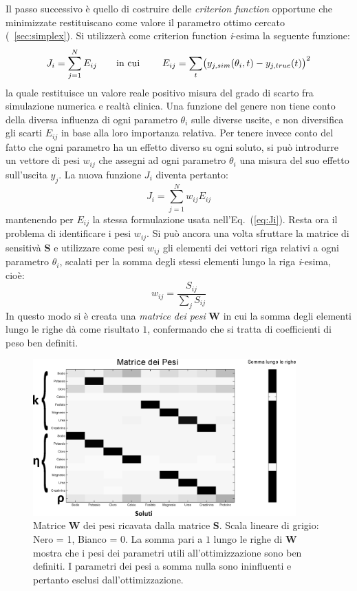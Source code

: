 Il passo successivo è quello di costruire delle \textit{criterion function} opportune che minimizzate restituiscano come valore il parametro ottimo cercato (\textsection~\ref{sec:simplex}). Si utilizzerà come criterion function \textit{i}-esima la seguente funzione:
\begin{equation}\label{eq:Ji}
	J_i = \sum_{j=1}^N E_{ij} \text{\qquad in cui \qquad}  E_{ij} = \sum_t \bigl(y_{j,sim}(\theta_i,t)-y_{j,true}(t)\bigr)^2
\end{equation}
la quale restituisce un valore reale positivo misura del grado di scarto fra simulazione numerica e realtà clinica. Una funzione del genere non tiene conto della diversa influenza di ogni parametro $\theta_i$ sulle diverse uscite, e non diversifica gli scarti $E_{ij}$ in base alla loro importanza relativa. Per tenere invece conto del fatto che ogni parametro ha un effetto diverso su ogni soluto, si può introdurre un vettore di pesi $w_{ij}$ che assegni ad ogni parametro $\theta_i$ una misura del suo effetto sull'uscita $y_j$. La nuova funzione $J_i$ diventa pertanto:
\begin{equation}
	J_i = \sum_{j=1}^N w_{ij} E_{ij}
\end{equation}
mantenendo per $E_{ij}$ la stessa formulazione usata nell'Eq.~(\ref{eq:Ji}). Resta ora il problema di identificare i pesi $w_{ij}$. Si può ancora una volta sfruttare la matrice di sensitivà \textbf{S} e utilizzare come pesi $w_{ij}$ gli elementi dei vettori riga relativi a ogni parametro $\theta_i$, scalati per la somma degli stessi elementi lungo la riga \textit{i}-esima, cioè:
\begin{equation}
	w_{ij} = \frac{S_{ij}}{\sum_j S_{ij}}
\end{equation}
In questo modo si è creata una \textit{matrice dei pesi} \textbf{W} in cui la somma degli elementi lungo le righe dà come risultato $1$, confermando che si tratta di coefficienti di peso ben definiti.
\begin{figure}[!t]
	\centering
		\includegraphics[width=0.9\textwidth]{immagini/pesi.eps}
				\caption{Matrice \textbf{W} dei pesi ricavata dalla matrice \textbf{S}. Scala lineare di grigio: Nero = 1, Bianco = 0. La somma pari a $1$ lungo le righe di \textbf{W} mostra che i pesi dei parametri utili all'ottimizzazione sono ben definiti. I parametri dei pesi a somma nulla sono ininfluenti e pertanto esclusi dall'ottimizzazione.}\label{fig:pesi}
\end{figure}
